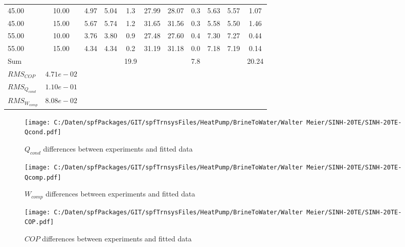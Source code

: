 \documentclass[english]{SPFShortReport}
\begin{document}
\begin{table}[!ht]
\begin{small}
\begin{center}
{\begin{tabular}{l | c c c c c c c c c c }
45.00  & 10.00 & 4.97 & 5.04 & 1.3 & 27.99 & 28.07 & 0.3 & 5.63 & 5.57 & 1.07\\ 
45.00  & 15.00 & 5.67 & 5.74 & 1.2 & 31.65 & 31.56 & 0.3 & 5.58 & 5.50 & 1.46\\ 
55.00  & 10.00 & 3.76 & 3.80 & 0.9 & 27.48 & 27.60 & 0.4 & 7.30 & 7.27 & 0.44\\ 
55.00  & 15.00 & 4.34 & 4.34 & 0.2 & 31.19 & 31.18 & 0.0 & 7.18 & 7.19 & 0.14\\ 
\hline 
 Sum &  & &  & 19.9 &  &  & 7.8 & &  & 20.24\\ 
\hline 
 $RMS_{COP}$ & $4.71e-02$ \\ 
 $RMS_{Q_{cond}}$ & $1.10e-01$ \\ 
 $RMS_{W_{comp}}$ & $8.08e-02$ \\ 
\hline
\hline
\end{tabular}
}
\label{ErrorsTable}
\end{center}
\end{small}
\end{table}
\begin{figure}[!ht]
\begin{center}
\texttt{[image: C:/Daten/spfPackages/GIT/spfTrnsysFiles/HeatPump/BrineToWater/Walter Meier/SINH-20TE/SINH-20TE-Qcond.pdf]}
\caption{$Q_{cond}$ differences between experiments and fitted data}
\label{QcongFig}
\end{center}
\end{figure}
\begin{figure}[!ht]
\begin{center}
\texttt{[image: C:/Daten/spfPackages/GIT/spfTrnsysFiles/HeatPump/BrineToWater/Walter Meier/SINH-20TE/SINH-20TE-Qcomp.pdf]}
\caption{$W_{comp}$ differences between experiments and fitted data}
\label{QcompFig}
\end{center}
\end{figure}
\begin{figure}[!ht]
\begin{center}
\texttt{[image: C:/Daten/spfPackages/GIT/spfTrnsysFiles/HeatPump/BrineToWater/Walter Meier/SINH-20TE/SINH-20TE-COP.pdf]}
\caption{$COP$ differences between experiments and fitted data}
\label{COPFig}
\end{center}
\end{figure}
\end{document}

